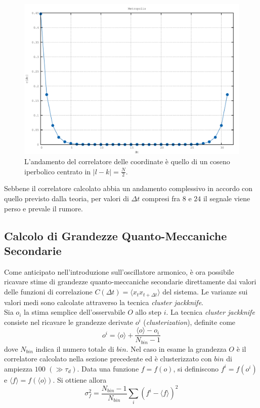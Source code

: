 \begin{figure}[H]
\centering
\includegraphics[width=\textwidth]{correlation}
\caption{L'andamento del correlatore delle coordinate è quello di un coseno iperbolico centrato in $|l-k|=\tfrac{N}{2}$. }
\label{fig:correlation}
\end{figure}
Sebbene il correlatore calcolato abbia un andamento complessivo in accordo con quello previsto dalla teoria, per valori di $\Delta t$ compresi fra $8$ e $24$ il segnale viene perso e prevale il rumore.

\subsection{Calcolo di Grandezze Quanto-Meccaniche Secondarie}

Come anticipato nell'introduzione sull'oscillatore armonico, è ora possibile ricavare stime di grandezze quanto-meccaniche secondarie direttamente dai valori delle funzioni di correlazione $C(\Delta t)=\langle x_tx_{t+\Delta t}\rangle$ del sistema.
Le varianze sui valori medi sono calcolate attraverso la tecnica \textit{cluster jackknife}.
\\

Sia $o_i$ la stima semplice dell'osservabile $O$ allo step $i$. La tecnica \textit{cluster jackknife} consiste nel ricavare le grandezze derivate $o^i$ (\textit{clusterization}), definite come $$o^i=\langle o\rangle+\frac{\langle o\rangle-o_i}{N_{bin}-1}$$ dove $N_{bin}$ indica il numero totale di $bin$. Nel caso in esame la grandezza $O$ è il correlatore calcolato nella sezione precedente ed è clusterizzato con $bin$ di ampiezza $100$ $(\gg\tau_d)$. Data una funzione $f=f(o)$, si definiscono $f^i=f(o^i)$ e $\langle f\rangle=f(\langle o\rangle)$. Si ottiene allora $$\sigma^2_f=\frac{N_{bin}-1}{N_{bin}}\sum\limits_i(f^i-\langle f\rangle)^2$$

